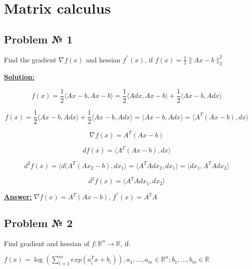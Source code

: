 \section{Matrix calculus}

\subsection{Problem № 1} Find the gradient $\nabla f(x)$ and hessian $f^{''}(x)$, if $f(x) = \frac{1}{2} \|Ax-b \|^2_2$

\underline{\textbf{Solution:}}

\begin{equation*}
    f(x) = \frac{1}{2} \langle Ax-b, Ax-b \rangle = \frac{1}{2} \langle Adx, Ax-b \rangle + \frac{1}{2} \langle Ax-b, Adx \rangle 
\end{equation*}

\begin{equation*}
    f(x) = \frac{1}{2} \langle Ax - b, Adx \rangle +
    \frac{1}{2} \langle Ax - b, Adx \rangle = 
    \langle Ax-b, Adx \rangle = \langle A^T(Ax-b), dx \rangle
\end{equation*}

\begin{equation*}
    \nabla f(x) = A^T(Ax-b)
\end{equation*}

\begin{equation*}
    df(x) = \langle A^T(Ax-b), dx \rangle
\end{equation*}

\begin{equation*}
    d^2f(x) = \langle d(A^T(Ax_2-b), dx_1 \rangle = \langle
    A^TAdx_2, dx_1 \rangle = \langle dx_1, A^TAdx_2 \rangle
\end{equation*}

\begin{equation*}
d^2f(x) = \langle A^TAdx_1, dx_2 \rangle
\end{equation*}

\underline{\textbf{Answer:}} $\nabla f(x) = A^T(Ax-b)$, $f^{''}(x) = A^TA$


\subsection{Problem № 2} Find gradient and hessian of $f: \mathds{R}^n \rightarrow \mathds{R}$, if:

$f(x) = \log \left( \sum\limits_{i=1}^m exp(a^T_ix + b_i) \right), a_1, ..., a_m \in \mathds{R}^n; b_1, ..., b_m \in \mathds{R}$


